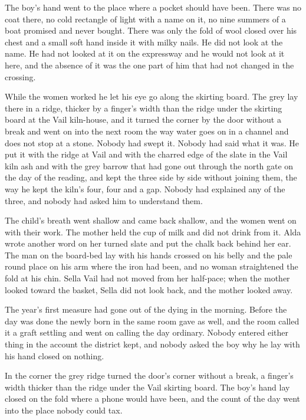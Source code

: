 The boy's hand went to the place where a pocket should have been. There was no coat there, no cold rectangle of light with a name on it, no nine summers of a boat promised and never bought. There was only the fold of wool closed over his chest and a small soft hand inside it with milky nails. He did not look at the name. He had not looked at it on the expressway and he would not look at it here, and the absence of it was the one part of him that had not changed in the crossing.

While the women worked he let his eye go along the skirting board. The grey lay there in a ridge, thicker by a finger's width than the ridge under the skirting board at the Vail kiln-house, and it turned the corner by the door without a break and went on into the next room the way water goes on in a channel and does not stop at a stone. Nobody had swept it. Nobody had said what it was. He put it with the ridge at Vail and with the charred edge of the slate in the Vail kiln ash and with the grey barrow that had gone out through the north gate on the day of the reading, and kept the three side by side without joining them, the way he kept the kiln's four, four and a gap. Nobody had explained any of the three, and nobody had asked him to understand them.

The child's breath went shallow and came back shallow, and the women went on with their work. The mother held the cup of milk and did not drink from it. Alda wrote another word on her turned slate and put the chalk back behind her ear. The man on the board-bed lay with his hands crossed on his belly and the pale round place on his arm where the iron had been, and no woman straightened the fold at his chin. Sella Vail had not moved from her half-pace; when the mother looked toward the basket, Sella did not look back, and the mother looked away.

The year's first measure had gone out of the dying in the morning. Before the day was done the newly born in the same room gave as well, and the room called it a graft settling and went on calling the day ordinary. Nobody entered either thing in the account the district kept, and nobody asked the boy why he lay with his hand closed on nothing.

In the corner the grey ridge turned the door's corner without a break, a finger's width thicker than the ridge under the Vail skirting board. The boy's hand lay closed on the fold where a phone would have been, and the count of the day went into the place nobody could tax.
